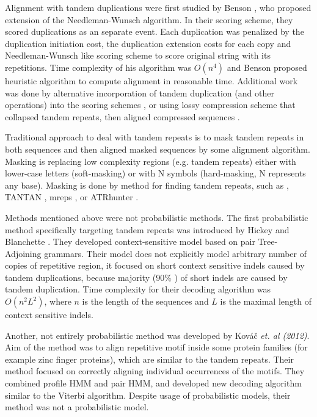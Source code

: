 Alignment with tandem duplications were first studied by Benson
\cite{Benson1997}, who proposed extension of the Needleman-Wunsch algorithm. In
their scoring scheme, they scored duplications as an separate event. Each
duplication was penalized by the duplication initiation cost, the duplication extension
costs for each copy and Needleman-Wunsch like scoring scheme to score original
string with its repetitions. Time complexity of his algorithm was $O(n^4)$ and
Benson proposed heuristic algorithm to compute alignment in reasonable time.
Additional work was done by alternative incorporation of tandem duplication
(and other operations) into the scoring schemes \cite{Sammeth2006, Berard2006,
Freschi2012}, or using lossy compression scheme that collapsed tandem repeats,
then aligned compressed sequences \cite{Freschi2012}.

Traditional approach to deal with tandem repeats is to mask tandem repeats in
both sequences and then aligned masked sequences by some alignment algorithm.
Masking is replacing low complexity regions (e.g. tandem repeats) either with
lower-case letters (soft-masking) or with N symbols (hard-masking, N represents
any base). Masking is done by method for finding tandem repeats, such as
 \cite{Benson1999}, TANTAN
\cite{Frith2011}, mreps \cite{Kolpakov2003}, or ATRhunter \cite{Wexler2005}. 

Methods mentioned above were not probabilistic methods. The first probabilistic
method specifically targeting tandem repeats was introduced by Hickey and
Blanchette \cite{Hickey2011}.  They developed context-sensitive model based on
pair Tree-Adjoining grammars.  Their model does not explicitly model arbitrary
number of copies of repetitive region, it focused on short context sensitive
indels caused by tandem duplications, because majority ($90\%$
\cite{Hickey2011}) of short indels are caused by tandem duplication. Time
complexity for their decoding algorithm was $O(n^2L^2)$, where $n$ is the
length of the sequences and $L$ is the maximal length of context sensitive
indels.

Another, not entirely probabilistic method was developed by Kováč {\it et. al
(2012)}\nocite{Kovac2012}. Aim of the method was to align repetitive motif
inside some protein families (for example zinc finger proteins), which are
similar to the tandem repeats. Their method focused on correctly aligning
individual occurrences of the motifs. They combined profile HMM and pair HMM,
and developed new decoding algorithm similar to the Viterbi algorithm. Despite
usage of probabilistic models, their method was not a probabilistic model. 

